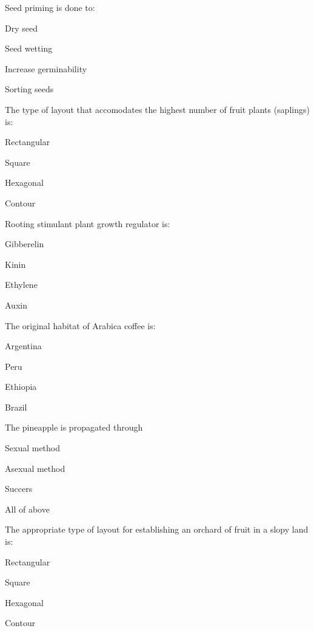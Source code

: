 \begin{questions}
\question Seed priming is done to:
  \begin{items}
  \item Dry seed
  \item Seed wetting
  \item Increase germinability
  \item Sorting seeds
  \end{items}

\question The type of layout that accomodates the highest number of fruit plants (saplings) is:
  \begin{items}
  \item Rectangular
  \item Square
  \item Hexagonal
  \item Contour
  \end{items}

\question Rooting stimulant plant growth regulator is:
  \begin{items}
  \item Gibberelin
  \item Kinin
  \item Ethylene
  \item Auxin
  \end{items}

\question The original habitat of Arabica coffee is:
  \begin{items}
  \item Argentina
  \item Peru
  \item Ethiopia
  \item Brazil
  \end{items}

\question The pineapple is propagated through \fillin[][3cm]
  \begin{items}
  \item Sexual method
  \item Asexual method
  \item Succers
  \item All of above
  \end{items}

\question The appropriate type of layout for establishing an orchard of fruit in a slopy land is:
  \begin{items}
  \item Rectangular
  \item Square
  \item Hexagonal
  \item Contour
  \end{items}


\end{questions}
